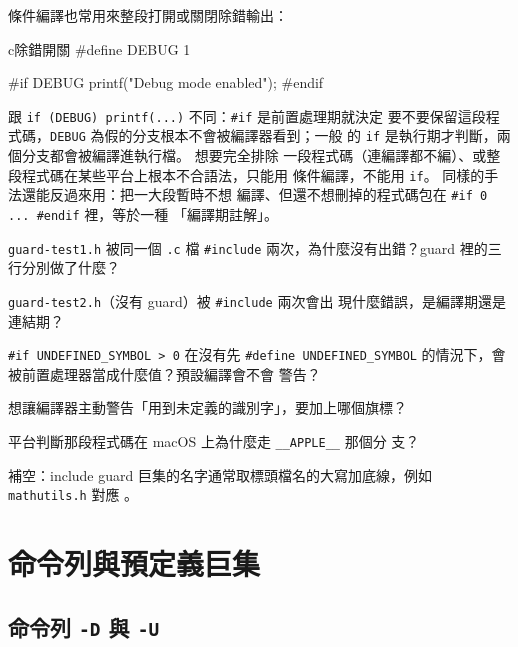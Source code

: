 條件編譯也常用來整段打開或關閉除錯輸出：

\begin{code}{c}{除錯開關}
#define DEBUG 1

#if DEBUG
    printf("Debug mode enabled\n");
#endif
\end{code}

跟 \texttt{if (DEBUG) printf(...)} 不同：\texttt{\#if} 是前置處理期就決定
要不要保留這段程式碼，\texttt{DEBUG} 為假的分支根本不會被編譯器看到；一般
的 \texttt{if} 是執行期才判斷，兩個分支都會被編譯進執行檔。 想要完全排除
一段程式碼（連編譯都不編）、或整段程式碼在某些平台上根本不合語法，只能用
條件編譯，不能用 \texttt{if}。 同樣的手法還能反過來用：把一大段暫時不想
編譯、但還不想刪掉的程式碼包在 \texttt{\#if 0 ... \#endif} 裡，等於一種
「編譯期註解」。


\begin{drills}[label=drills:pp-cond]
\item \texttt{guard-test1.h} 被同一個 \texttt{.c} 檔 \texttt{\#include}
兩次，為什麼沒有出錯？guard 裡的三行分別做了什麼？
\item \texttt{guard-test2.h}（沒有 guard）被 \texttt{\#include} 兩次會出
現什麼錯誤，是編譯期還是連結期？
\item \texttt{\#if UNDEFINED\_SYMBOL > 0} 在沒有先 \texttt{\#define
UNDEFINED\_SYMBOL} 的情況下，會被前置處理器當成什麼值？預設編譯會不會
警告？
\item 想讓編譯器主動警告「用到未定義的識別字」，要加上哪個旗標？
\item 平台判斷那段程式碼在 macOS 上為什麼走 \texttt{\_\_APPLE\_\_} 那個分
支？
\item 補空：include guard 巨集的名字通常取標頭檔名的大寫加底線，例如
\texttt{mathutils.h} 對應 \underline{\hspace{2em}}。
\end{drills}

\section{命令列與預定義巨集}
\label{sec:pp-cmdline}

\subsection{命令列 \texttt{-D} 與 \texttt{-U}}

